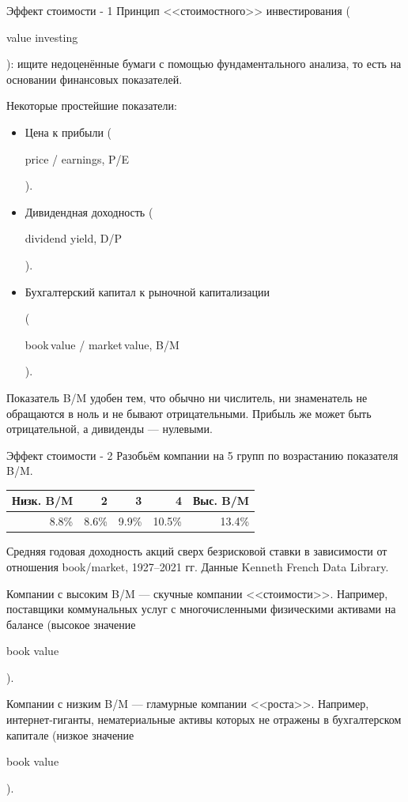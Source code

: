\documentclass{beamer}
\newcommand{\en}[1]{\begin{otherlanguage}{english}#1\end{otherlanguage}}
\begin{document}
\begin{frame}{Эффект стоимости - 1}
\justify
Принцип <<стоимостного>> инвестирования (\en{value investing}): ищите 
недоценённые бумаги с помощью фундаментального анализа, то есть на основании
финансовых показателей.

\justify
Некоторые простейшие показатели:
\begin{itemize}
\justifying
\item Цена к прибыли (\en{price / earnings, P/E}).
\item Дивидендная доходность (\en{dividend yield, D/P}).
\item Бухгалтерский капитал к рыночной капитализации

(\en{book\,value / market\,value, B/M}).
\end{itemize}

\justify
Показатель B/M удобен тем, что обычно ни числитель, ни знаменатель не 
обращаются в ноль и не бывают отрицательными. Прибыль же может быть 
отрицательной, а дивиденды --- нулевыми.
\end{frame}




\begin{frame}{Эффект стоимости - 2}
\justify
Разобьём компании на 5 групп по возрастанию показателя B/M.

\justify
\centering
\begin{tabular}{r|r|r|r|r}
Низк. B/M &     2 &     3 &      4 & Выс. B/M \\ \hline
    8.8\% & 8.6\% & 9.9\% & 10.5\% &   13.4\% 
\end{tabular}

\centering
{\scriptsize Средняя годовая доходность акций сверх безрисковой ставки в
зависимости от отношения book/market, 1927--2021 гг. Данные Kenneth French 
Data Library.}

\justify
Компании с высоким B/M --- скучные компании <<стоимости>>. Например,
поставщики коммунальных услуг с многочисленными физическими активами на балансе
(высокое значение \en{book value}).

\justify
Компании с низким B/M --- гламурные компании <<роста>>. Например,
интернет-гиганты, нематериальные активы которых не отражены в бухгалтерском
капитале (низкое значение \en{book value}). 

\end{frame}
\end{document}
